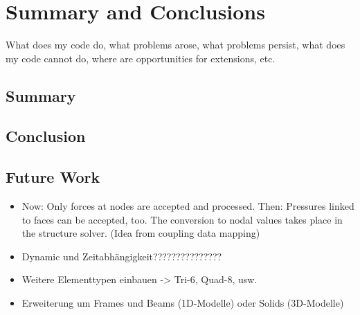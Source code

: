 \section{Summary and Conclusions}
What does my code do, what problems arose, what problems persist, what does my code cannot do, where are opportunities for extensions, etc.
 \subsection{Summary}
 
 
 \subsection{Conclusion}


 \subsection{Future Work}
  \begin{itemize}
  	\item Now: Only forces at nodes are accepted and processed. Then: Pressures linked to faces can be accepted, too. The conversion to nodal values takes place in the structure solver. (Idea from coupling data mapping)
  	\item Dynamic und Zeitabhängigkeit???????????????
  	\item Weitere Elementtypen einbauen -> Tri-6, Quad-8, usw.
  	\item Erweiterung um Frames und Beams (1D-Modelle) oder Solids (3D-Modelle)
  \end{itemize}
\newpage